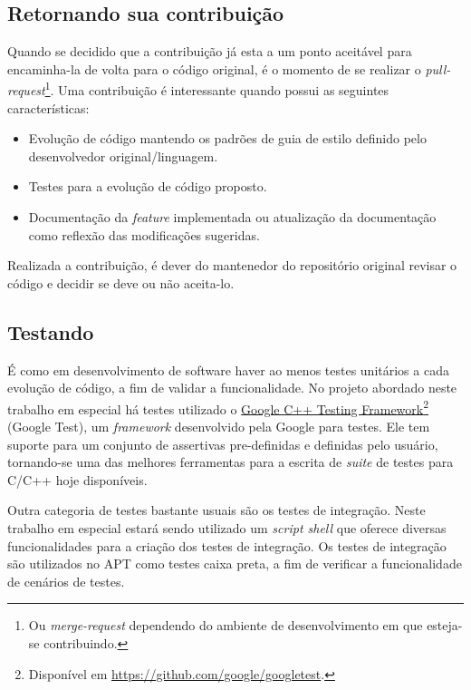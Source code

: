 \subsection*{Retornando sua contribuição} %
\label{sub:retornando_sua_contribui_o}

Quando se decidido que a contribuição já esta a um ponto aceitável para encaminha-la de volta para o código original, é o momento de se realizar o \textit{pull-request}\footnote{Ou \textit{merge-request} dependendo do ambiente de desenvolvimento em que esteja-se contribuindo.}. Uma contribuição é interessante quando possui as seguintes características:


\begin{itemize}
	\item Evolução de código mantendo os padrões de guia de estilo definido pelo desenvolvedor original/linguagem.
	\item Testes para a evolução de código proposto.
	\item Documentação da \textit{feature} implementada ou atualização da documentação como reflexão das modificações sugeridas.
\end{itemize}

Realizada a contribuição, é dever do mantenedor do repositório original revisar o código e decidir se deve ou não aceita-lo.


\subsection*{Testando} %
\label{sub:testando}

É como em desenvolvimento de software haver ao menos testes unitários a cada evolução de código, a fim de validar a funcionalidade. No projeto abordado neste trabalho em especial há testes utilizado o \href{https://github.com/google/googletest}{Google C++ Testing Framework}\footnote{Disponível em \url{https://github.com/google/googletest}.} (Google Test), um \textit{framework} desenvolvido pela Google para testes. Ele tem suporte para um conjunto de assertivas pre-definidas e definidas pelo usuário, tornando-se uma das melhores ferramentas para a escrita de \textit{suite} de testes para C/C++ hoje disponíveis.

Outra categoria de testes bastante usuais são os testes de integração. Neste trabalho em especial estará sendo utilizado um \textit{script shell} que oferece diversas funcionalidades para a criação dos testes de integração. Os testes de integração são utilizados no {\code APT} como testes caixa preta, a fim de verificar a funcionalidade de cenários de testes.

